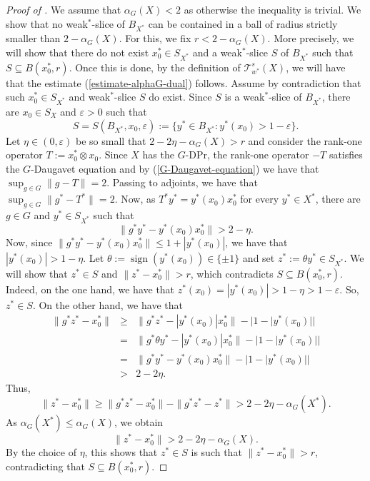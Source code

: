 \documentclass[a4paper,12pt]{amsart}
\theoremstyle{definition}
\theoremstyle{definition}
\theoremstyle{remark}
\numberwithin{equation}{section}
\DeclareMathOperator{\sign}{sign}
\renewcommand{\geq}{\geqslant}
\renewcommand{\leq}{\leqslant}
\newcommand{\<}{\langle}
\renewcommand{\>}{\rangle}
\newcommand{\e}{\varepsilon}
\begin{document}
	\begin{proof}[Proof of ] We assume that $\alpha_G(X)<2$ as otherwise the inequality is trivial.   We show that no weak$^*$-slice of $B_{X^*}$ can be contained in a ball of radius strictly smaller than $2-\alpha_G(X).$
		For this, we fix $r < 2 - \alpha_G(X)$. More precisely, we will show that there do not exist $x_0^* \in S_{X^*}$ and a weak$^*$-slice $S$ of $B_{X^*}$ such that $S \subseteq B(x_0^*, r)$. Once this is done, by the definition of $\mathcal{T}_{w^*}^s(X)$, we will have that the estimate (\ref{estimate-alphaG-dual}) follows. Assume by contradiction that such $x_0^* \in S_{X^*}$ and weak$^*$-slice $S$ do exist. Since $S$ is a weak$^*$-slice of $B_{X^*}$, there are $x_0 \in S_X$ and $\e>0$ such that 
		\begin{equation*}
			S = S(B_{X^*}, x_0, \e) := \{ y^* \in B_{X^*}: y^*(x_0) > 1 - \e \}.
		\end{equation*}
		Let $\eta \in (0, \e)$ be so small that $2 - 2 \eta - \alpha_G(X) > r$ and consider the rank-one operator $T:=x_0^* \otimes x_0$. Since $X$ has the $G$-DPr, the rank-one operator $-T$ satisfies the $G$-Daugavet equation and by (\ref{G-Daugavet-equation}) we have that $\sup_{g \in G} \|g - T\| = 2$. Passing to adjoints, we have that $\sup_{g \in G} \|g^* - T^*\| = 2$. Now, as $T^*y^* = y^*(x_0) x_0^*$ for every $y^* \in X^*$, there are $g \in G$ and $y^* \in S_{X^*}$ such that 
		\begin{equation*}
			\|g^* y^* - y^*(x_0) x_0^*\| > 2 - \eta. 
		\end{equation*}
		Now, since  $\|g^* y^* - y^*(x_0) x_0^*\| \leq 1 + |y^*(x_0)|$, we have that $|y^*(x_0)| > 1 - \eta$. Let $\theta := \sign(y^*(x_0)) \in \{\pm 1\}$ and set $z^* := \theta y^* \in S_{X^*}$. We will show that $z^* \in S$ and $\|z^* - x_0^*\| > r$, which contradicts $S \subseteq B(x_0^*, r)$. Indeed, on the one hand, we have that $z^*(x_0) = |y^*(x_0)| > 1 - \eta > 1 -\e$. So, $z^* \in S$. On the other hand, we have that 
		\begin{eqnarray*}
			\|g^*z^* - x_0^*\| &\geq& \| g^* z^* - |y^*(x_0)| x_0^*\| - |1 - |y^*(x_0)| | \\
			&=& \| g^* \theta y^* - |y^*(x_0)| x_0^*\| - |1 - |y^*(x_0)|| \\
			&=& \|g^* y^* - y^*(x_0) x_0^*\| - |1 - |y^*(x_0)|| \\
			&>& 2 - 2 \eta.
		\end{eqnarray*}
		Thus,
		\begin{equation*}
			\|z^* - x_0^*\| \geq \|g^* z^* - x_0^*\| - \|g^* z^* - z^*\| > 2 - 2 \eta - \alpha_G(X^*). 
		\end{equation*}
		As $\alpha_G(X^*) \leq \alpha_G(X)$, we obtain 
		\begin{equation*}
			\|z^* - x_0^*\| > 2 - 2 \eta - \alpha_G(X).
		\end{equation*}
		By the choice of $\eta$, this shows that $z^* \in S$ is such that $\|z^* - x_0^*\| > r$, contradicting that $S \subseteq B(x_0^*, r)$. 
	\end{proof}
	
\end{document}
